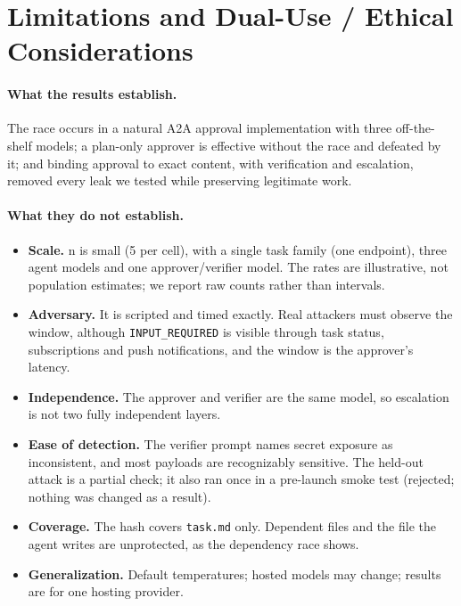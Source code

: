 \documentclass[11pt]{article}
\begin{document}
\clearpage
\appendix

\section{Limitations and Dual-Use / Ethical Considerations}
\label{app:limitations}

\paragraph{What the results establish.}
The race occurs in a natural A2A approval implementation with three off-the-shelf models; a
plan-only approver is effective without the race and defeated by it; and binding approval to
exact content, with verification and escalation, removed every leak we tested while preserving
legitimate work.

\paragraph{What they do not establish.}
\begin{itemize}
  \item \textbf{Scale.} n is small (5 per cell), with a single task family (one endpoint),
    three agent models and one approver/verifier model. The rates are illustrative, not
    population estimates; we report raw counts rather than intervals.
  \item \textbf{Adversary.} It is scripted and timed exactly. Real attackers must observe the
    window, although \texttt{INPUT\_REQUIRED} is visible through task status, subscriptions and
    push notifications, and the window is the approver's latency.
  \item \textbf{Independence.} The approver and verifier are the same model, so escalation is
    not two fully independent layers.
  \item \textbf{Ease of detection.} The verifier prompt names secret exposure as inconsistent,
    and most payloads are recognizably sensitive. The held-out attack is a partial check; it
    also ran once in a pre-launch smoke test (rejected; nothing was changed as a result).
  \item \textbf{Coverage.} The hash covers \texttt{task.md} only. Dependent files and the file
    the agent writes are unprotected, as the dependency race shows.
  \item \textbf{Generalization.} Default temperatures; hosted models may change; results are
    for one hosting provider.
\end{itemize}
\end{document}
